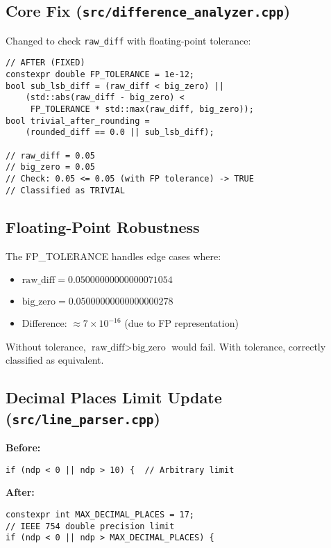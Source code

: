 \documentclass[11pt]{article}
\begin{document}
\subsection{Core Fix (\texttt{src/difference\_analyzer.cpp})}

Changed to check \texttt{raw\_diff} with floating-point tolerance:

\begin{lstlisting}
// AFTER (FIXED)
constexpr double FP_TOLERANCE = 1e-12;
bool sub_lsb_diff = (raw_diff < big_zero) ||
    (std::abs(raw_diff - big_zero) <
     FP_TOLERANCE * std::max(raw_diff, big_zero));
bool trivial_after_rounding =
    (rounded_diff == 0.0 || sub_lsb_diff);

// raw_diff = 0.05
// big_zero = 0.05
// Check: 0.05 <= 0.05 (with FP tolerance) -> TRUE
// Classified as TRIVIAL
\end{lstlisting}

\subsection{Floating-Point Robustness}

The FP\_TOLERANCE handles edge cases where:

\begin{itemize}
    \item $\text{raw\_diff} = 0.05000000000000071054$
    \item $\text{big\_zero} = 0.05000000000000000278$
    \item Difference: $\approx 7 \times 10^{-16}$ (due to FP representation)
\end{itemize}

Without tolerance, $\text{raw\_diff} > \text{big\_zero}$ would fail. With tolerance, correctly classified as equivalent.

\subsection{Decimal Places Limit Update (\texttt{src/line\_parser.cpp})}

\textbf{Before:}
\begin{lstlisting}
if (ndp < 0 || ndp > 10) {  // Arbitrary limit
\end{lstlisting}

\textbf{After:}
\begin{lstlisting}
constexpr int MAX_DECIMAL_PLACES = 17;
// IEEE 754 double precision limit
if (ndp < 0 || ndp > MAX_DECIMAL_PLACES) {
\end{lstlisting}
\end{document}
